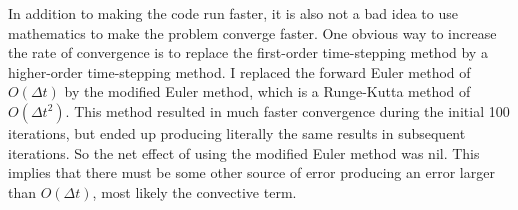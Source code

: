 In addition to making the code run faster, it is also not a bad idea to use mathematics to make the problem converge faster. One obvious way to increase the rate of convergence is to replace the first-order time-stepping method by a higher-order time-stepping method. I replaced the forward Euler method of $O(\Delta t)$ by the modified Euler method, which is a Runge-Kutta method of $O(\Delta t^2)$. This method resulted in much faster convergence during the initial 100 iterations, but ended up producing literally the same results in subsequent iterations. So the net effect of using the modified Euler method was nil. This implies that there must be some other source of error producing an error larger than $O(\Delta t)$, most likely the convective term.
